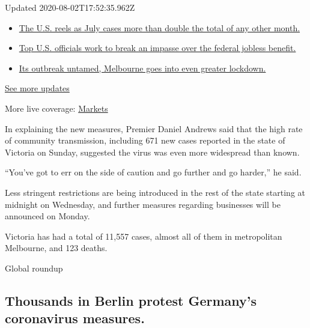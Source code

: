 Updated 2020-08-02T17:52:35.962Z

\begin{itemize}
\tightlist
\item
  \href{https://www.nytimes3xbfgragh.onion/2020/08/01/world/coronavirus-covid-19.html?action=click\&pgtype=Article\&state=default\&region=MAIN_CONTENT_1\&context=storylines_live_updates\#link-34047410}{The
  U.S. reels as July cases more than double the total of any other
  month.}
\item
  \href{https://www.nytimes3xbfgragh.onion/2020/08/01/world/coronavirus-covid-19.html?action=click\&pgtype=Article\&state=default\&region=MAIN_CONTENT_1\&context=storylines_live_updates\#link-780ec966}{Top
  U.S. officials work to break an impasse over the federal jobless
  benefit.}
\item
  \href{https://www.nytimes3xbfgragh.onion/2020/08/01/world/coronavirus-covid-19.html?action=click\&pgtype=Article\&state=default\&region=MAIN_CONTENT_1\&context=storylines_live_updates\#link-2bc8948}{Its
  outbreak untamed, Melbourne goes into even greater lockdown.}
\end{itemize}

\href{https://www.nytimes3xbfgragh.onion/2020/08/01/world/coronavirus-covid-19.html?action=click\&pgtype=Article\&state=default\&region=MAIN_CONTENT_1\&context=storylines_live_updates}{See
more updates}

More live coverage:
\href{https://www.nytimes3xbfgragh.onion/live/2020/07/31/business/stock-market-today-coronavirus?action=click\&pgtype=Article\&state=default\&region=MAIN_CONTENT_1\&context=storylines_live_updates}{Markets}

In explaining the new measures, Premier Daniel Andrews said that the
high rate of community transmission, including 671 new cases reported in
the state of Victoria on Sunday, suggested the virus was even more
widespread than known.

``You've got to err on the side of caution and go further and go
harder,'' he said.

Less stringent restrictions are being introduced in the rest of the
state starting at midnight on Wednesday, and further measures regarding
businesses will be announced on Monday.

Victoria has had a total of 11,557 cases, almost all of them in
metropolitan Melbourne, and 123 deaths.

Global roundup

\hypertarget{thousands-in-berlin-protest-germanys-coronavirus-measures}{%
\subsection{Thousands in Berlin protest Germany's coronavirus
measures.}\label{thousands-in-berlin-protest-germanys-coronavirus-measures}}

